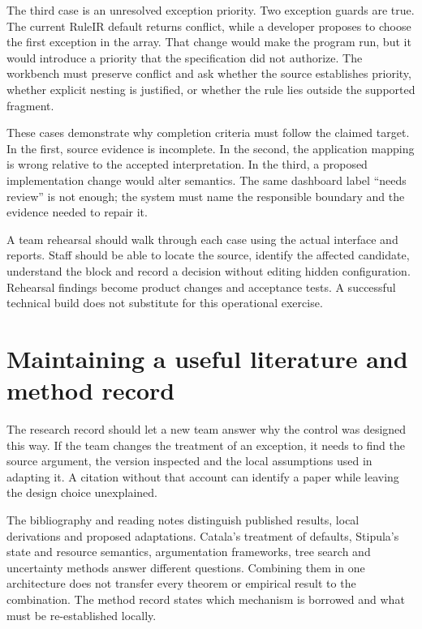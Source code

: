 \documentclass[12pt,a4paper,oneside,openany]{book}
\begin{document}
The third case is an unresolved exception priority. Two exception guards are
true. The current RuleIR default returns conflict, while a developer proposes to
choose the first exception in the array. That change would make the program run,
but it would introduce a priority that the specification did not authorize. The
workbench must preserve conflict and ask whether the source establishes priority,
whether explicit nesting is justified, or whether the rule lies outside the
supported fragment.

These cases demonstrate why completion criteria must follow the claimed target.
In the first, source evidence is incomplete. In the second, the application mapping
is wrong relative to the accepted interpretation. In the third, a proposed
implementation change would alter semantics. The same dashboard label ``needs
review'' is not enough; the system must name the responsible boundary and the
evidence needed to repair it.

A team rehearsal should walk through each case using the actual interface and
reports. Staff should be able to locate the source, identify the affected
candidate, understand the block and record a decision without editing hidden
configuration. Rehearsal findings become product changes and acceptance tests.
A successful technical build does not substitute for this operational exercise.

\section{Maintaining a useful literature and method record}
\label{merge:M10:13}


The research record should let a new team answer why the control was designed
this way. If the team changes the treatment of an exception, it needs to find
the source argument, the version inspected and the local assumptions used in
adapting it. A citation without that account can identify a paper while leaving
the design choice unexplained.

The bibliography and reading notes distinguish published results, local
derivations and proposed adaptations. Catala's treatment of defaults, Stipula's
state and resource semantics, argumentation frameworks, tree search and uncertainty
methods answer different questions. Combining them in one architecture does not
transfer every theorem or empirical result to the combination. The method record
states which mechanism is borrowed and what must be re-established locally.
\end{document}
